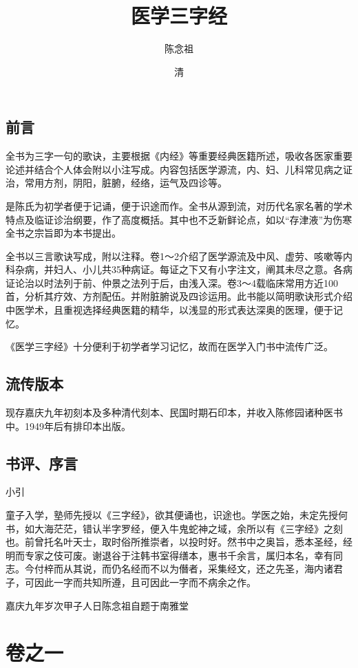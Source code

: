 \documentclass[a4paper,12pt,UTF8,twoside]{ctexbook}
\title{\heiti\zihao{0} 医学三字经}
\author{陈念祖}
\date{清}
\begin{document}
	
	\maketitle
	\tableofcontents
	
	\frontmatter
	
	\chapter{前言}
	全书为三字一句的歌诀，主要根据《内经》等重要经典医籍所述，吸收各医家重要论述并结合个人体会附以小注写成。内容包括医学源流，内、妇、儿科常见病之证治，常用方剂，阴阳，脏腑，经络，运气及四诊等。
	
	是陈氏为初学者便于记诵，便于识途而作。全书从源到流，对历代名家名著的学术特点及临证诊治纲要，作了高度概括。其中也不乏新鲜论点，如以“存津液”为伤寒全书之宗旨即为本书提出。
	
	全书以三言歌诀写成，附以注释。卷1～2介绍了医学源流及中风、虚劳、咳嗽等内科杂病，并妇人、小儿共35种病证。每证之下又有小字注文，阐其未尽之意。各病证论治以时法列于前、仲景之法列于后，由浅入深。卷3～4载临床常用方近100首，分析其疗效、方剂配伍。并附脏腑说及四诊运用。此书能以简明歌诀形式介绍中医学术，且重视选择经典医籍的精华，以浅显的形式表达深奥的医理，便于记忆。

	《医学三字经》十分便利于初学者学习记忆，故而在医学入门书中流传广泛。
	
	\chapter{流传版本}
	现存嘉庆九年初刻本及多种清代刻本、民国时期石印本，并收入陈修园诸种医书中。1949年后有排印本出版。
	
	\chapter{书评、序言}
	小引
	
	童子入学，塾师先授以《三字经》，欲其便诵也，识途也。学医之始，未定先授何书，如大海茫茫，错认半字罗经，便入牛鬼蛇神之域，余所以有《三字经》之刻也。前曾托名叶天士，取时俗所推崇者，以投时好。然书中之奥旨，悉本圣经，经明而专家之伎可废。谢退谷于注韩书室得缮本，惠书千余言，属归本名，幸有同志。今付梓而从其说，而仍名经而不以为僭者，采集经文，还之先圣，海内诸君子，可因此一字而共知所遵，且可因此一字而不病余之作。
	
	嘉庆九年岁次甲子人日陈念祖自题于南雅堂

	\mainmatter
	
	\part{卷之一}
\end{document}
